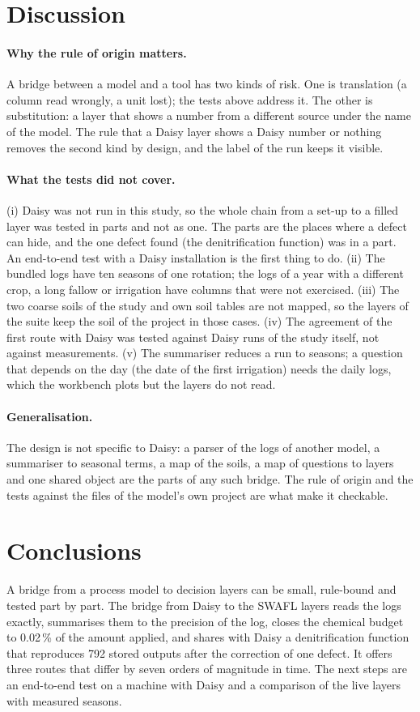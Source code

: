 \section{Discussion}
\paragraph{Why the rule of origin matters.} A bridge between a model and a tool has two kinds of risk. One is translation (a column read wrongly, a unit lost); the tests above address it. The other is substitution: a layer that shows a number from a different source under the name of the model. The rule that a Daisy layer shows a Daisy number or nothing removes the second kind by design, and the label of the run keeps it visible.

\paragraph{What the tests did not cover.} (i) Daisy was not run in this study, so the whole chain from a set-up to a filled layer was tested in parts and not as one. The parts are the places where a defect can hide, and the one defect found (the denitrification function) was in a part. An end-to-end test with a Daisy installation is the first thing to do. (ii) The bundled logs have ten seasons of one rotation; the logs of a year with a different crop, a long fallow or irrigation have columns that were not exercised. (iii) The two coarse soils of the study and own soil tables are not mapped, so the layers of the suite keep the soil of the project in those cases. (iv) The agreement of the first route with Daisy was tested against Daisy runs of the study itself, not against measurements. (v) The summariser reduces a run to seasons; a question that depends on the day (the date of the first irrigation) needs the daily logs, which the workbench plots but the layers do not read.

\paragraph{Generalisation.} The design is not specific to Daisy: a parser of the logs of another model, a summariser to seasonal terms, a map of the soils, a map of questions to layers and one shared object are the parts of any such bridge. The rule of origin and the tests against the files of the model's own project are what make it checkable.

\section{Conclusions}
A bridge from a process model to decision layers can be small, rule-bound and tested part by part. The bridge from Daisy to the SWAFL layers reads the logs exactly, summarises them to the precision of the log, closes the chemical budget to 0.02\,\% of the amount applied, and shares with Daisy a denitrification function that reproduces 792 stored outputs after the correction of one defect. It offers three routes that differ by seven orders of magnitude in time. The next steps are an end-to-end test on a machine with Daisy and a comparison of the live layers with measured seasons.

